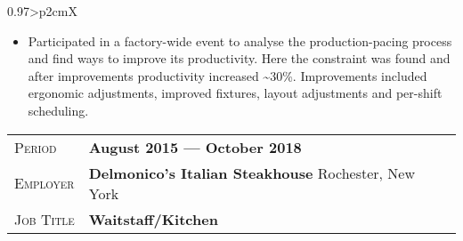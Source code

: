 \documentclass[a4paper, oneside, final]{scrartcl} %
\newcommand{\gray}{\rowcolor[gray]{.90}} %
\begin{document}
\begin{center}
\begin{tabularx}{0.97\linewidth}{>{\raggedleft\scshape}p{2cm}X}
{\begin{itemize}
            \begin{itemize}
                \item{Participated in a factory-wide event to analyse the production-pacing process and find ways to improve its productivity. 
                Here the constraint was found and after improvements productivity increased \textasciitilde30\%{}. 
                Improvements included ergonomic adjustments, improved fixtures, layout adjustments and per-shift scheduling.}
            \end{itemize}
        \end{itemize}
    }
    \vspace{-10pt}
\end{tabularx}


\begin{tabularx}{0.97\linewidth}{>{\raggedleft\scshape}p{2cm}X}
    \gray{}Period & \textbf{August 2015 --- October 2018}\\
    \gray{}Employer & \textbf{Delmonico's Italian Steakhouse} \hfill Rochester,  New York\\
    \gray{}Job Title & \textbf{Waitstaff/Kitchen}
\end{tabularx}





\end{center}
\end{document}

